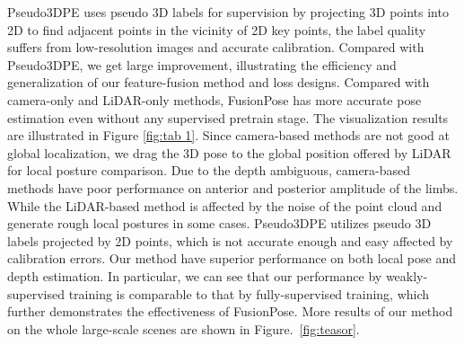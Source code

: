 \documentclass[letterpaper]{article} %
\begin{document}
Pseudo3DPE uses pseudo 3D labels for supervision by projecting 3D points into 2D to find adjacent points in the vicinity of 2D key points, the label quality suffers from low-resolution images and accurate calibration. 
Compared with Pseudo3DPE, we get large improvement, illustrating the efficiency and generalization of our feature-fusion method and loss designs. Compared with camera-only and LiDAR-only methods, FusionPose has more accurate pose estimation even without any supervised pretrain stage. 
The visualization results are illustrated in Figure \ref{fig:tab 1}. Since camera-based methods are not good at global localization, we drag the 3D pose to the global position offered by LiDAR for local posture comparison. Due to the depth ambiguous, camera-based methods have poor performance on anterior and posterior amplitude of the limbs. While the LiDAR-based method is affected by the noise of the point cloud and generate rough local postures in some cases. Pseudo3DPE utilizes pseudo 3D labels projected by 2D points, which is not accurate enough and easy affected by calibration errors. Our method have superior performance on both local pose and depth estimation. In particular, we can see that our performance by weakly-supervised training is comparable to that by fully-supervised training, which further demonstrates the effectiveness of FusionPose. More results of our method on the whole large-scale scenes are shown in Figure.~\ref{fig:teasor}.
\end{document}
